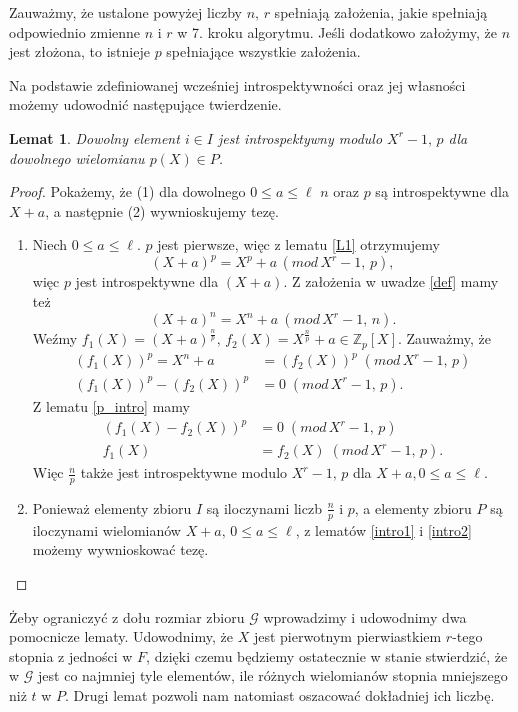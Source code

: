 \documentclass[declaration,shortabstract]{iithesis}
\theoremstyle{definition}
\theoremstyle{remark} \newtheorem{observation}{Obserwacja}
\theoremstyle{plain} \newtheorem{theorem}{Twierdzenie}
\theoremstyle{plain} \newtheorem{lemma}{Lemat}
\theoremstyle{remark} \newtheorem*{remark*}{Uwaga}
\theoremstyle{reminder} \newtheorem*{reminder*}{Przypomnienie}
\begin{document}
Zauważmy, że ustalone powyżej liczby $n, \, r$ spełniają założenia, jakie spełniają odpowiednio zmienne $n$ i $r$ w 7. kroku algorytmu. Jeśli dodatkowo założymy, że $n$ jest złożona, to istnieje $p$ spełniające wszystkie założenia.

Na podstawie zdefiniowanej wcześniej introspektywności oraz jej własności możemy udowodnić następujące twierdzenie.

\begin{lemma}\label{intro}
	Dowolny element $i \in I$ jest introspektywny modulo $X^r - 1, \, p$ dla dowolnego wielomianu $p(X) \in P$.
\end{lemma}
	
\begin{proof}
    Pokażemy, że (1) dla dowolnego $0 \leq a \leq \ell$ $n$ oraz $p$ są introspektywne dla $X + a$, a następnie (2) wywnioskujemy tezę.
    \begin{enumerate}[label=(\arabic*),leftmargin=.4in]
	\item Niech $0 \leq a \leq \ell$. $p$ jest pierwsze, więc z lematu \ref{L1} otrzymujemy \[(X + a)^p = X^p + a \, (mod \, X^r - 1, \, p),\] więc $p$ jest introspektywne dla $(X + a)$. Z założenia w uwadze \ref{def} mamy też  \[(X + a)^n = X^n + a \: (mod \, X^r - 1, \, n).\] Weźmy $f_1(X) = (X + a)^{\frac{n}{p}}, \, f_2(X) = X^{\frac{n}{p}} + a \in \mathbb{Z}_p[X]$. Zauważmy, że 
	\begin{align*}
		(f_1(X))^p = X^n + a    & = (f_2(X))^p \; (mod \, X^r - 1, \, p) \\
		(f_1(X))^p - (f_2(X))^p & = 0 \; (mod \, X^r - 1, \, p).         
	\end{align*}
	Z lematu \ref{p_intro} mamy
	\begin{align*}
		(f_1(X) - f_2(X))^p & = 0 \; (mod \, X^r - 1, \, p)       \\
		f_1(X)              & = f_2(X) \; (mod \, X^r - 1, \, p). 
	\end{align*}
	Więc $\frac{n}{p}$ także jest introspektywne modulo $X^r - 1, \, p$ dla $X + a, 0 \leq a \leq \ell$.
    \item Ponieważ elementy zbioru $I$ są iloczynami liczb $\frac{n}{p}$ i $p$, a elementy zbioru $P$ są iloczynami wielomianów $X + a, \, 0 \leq a \leq \ell$, z lematów \ref{intro1} i \ref{intro2} możemy wywnioskować tezę.
    \end{enumerate}
\end{proof} 

Żeby ograniczyć z dołu rozmiar zbioru $\mathcal{G}$ wprowadzimy i udowodnimy dwa pomocnicze lematy. Udowodnimy, że $X$ jest pierwotnym pierwiastkiem $r$-tego stopnia z jedności w $F$, dzięki czemu będziemy ostatecznie w stanie stwierdzić, że w $\mathcal{G}$ jest co najmniej tyle elementów, ile różnych wielomianów stopnia mniejszego niż $t$ w $P$. Drugi lemat pozwoli nam natomiast oszacować dokładniej ich liczbę.
\end{document}
